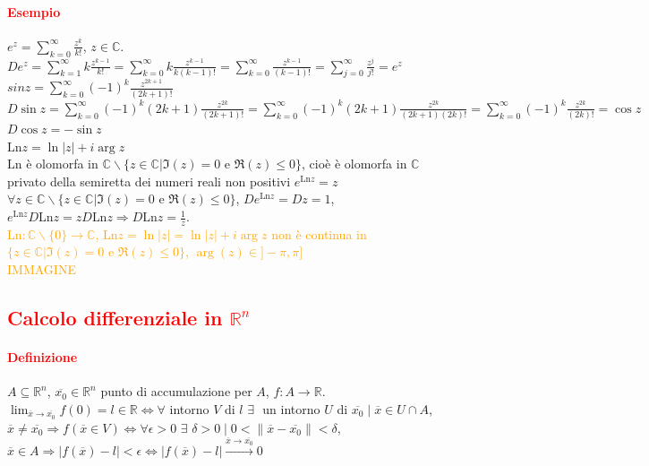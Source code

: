 \documentclass{article}
\newcommand{\R}{\mathbb{R}}
\newcommand{\C}{\mathbb{C}}
\newcommand{\Ln}{\text{Ln}}
\begin{document}
\paragraph{\textcolor{red}{Esempio}}
$e^z=\sum_{k=0}^{\infty}\frac{z^k}{k!}$, $z \in \C$.\\
$De^z=\sum_{k=1}^{\infty}k\frac{z^{k-1}}{k!}=\sum_{k=0}^{\infty} k \frac{z^{k-1}}{k(k-1)!}=\sum_{k=0}^{\infty} \frac{z^{k-1}}{(k-1)!}=\sum_{j=0}^{\infty} \frac{z^{j}}{j!}=e^z$\\
$sin z= \sum_{k=0}^{\infty}(-1)^k\frac{z^{2k+1}}{(2k+1)!}$\\
$D\sin z=\sum_{k=0}^{\infty}(-1)^k(2k+1)\frac{z^{2k}}{(2k+1)!}=\sum_{k=0}^{\infty}(-1)^k(2k+1)\frac{z^{2k}}{(2k+1)(2k)!}=\sum_{k=0}^{\infty}(-1)^k\frac{z^{2k}}{(2k)!}=\cos z$\\
$D\cos z=-\sin z$\\
$\Ln z = \ln |z|+i \arg z$\\
$\Ln $ è olomorfa in $\C\backslash\{z \in \C|\Im(z)=0 \text{  e  } \Re(z) \leq 0 \}$, cioè è olomorfa in $\C$ privato della semiretta dei numeri reali non positivi $e^{\Ln z}=z$ $\forall z \in \C\backslash\{z \in \C|\Im(z)=0 \text{  e  } \Re(z) \leq 0 \}$, $D e^{\Ln z}=Dz =1$, $e^{\Ln z}D\Ln z=zD\Ln z \Rightarrow D \Ln z =\frac{1}{z}$.\\
\textcolor{orange}{$\Ln: \C\backslash\{0\}\rightarrow\C$, $\Ln z=\ln |z|=\ln |z|+i \arg z$ non è continua in $\{z \in \C|\Im(z)=0 \text{  e  } \Re(z)\leq 0\}$, $\arg(z)\in]-\pi,\pi]$\\
IMMAGINE}

\subsection{\textcolor{red}{Calcolo differenziale in $\R^n$}}
\paragraph{\textcolor{red}{Definizione}}
$A \subseteq \R^n$, $\overline{x_0}\in \R^n$ punto di accumulazione per $A$, $f:A\rightarrow \R$. $ \lim_{\overline{x}\rightarrow\overline{x_0} }f(0)=l \in \R\Leftrightarrow \forall$ intorno $V$ di $l\,\, \exists\,\,$ un intorno $U$ di $\overline{x_0}\mid \overline{x}\in U \cap A$, $\overline{x}\neq \overline{x_0}\Rightarrow f(\overline{x}\in V) \Leftrightarrow \forall \epsilon >0\,\, \exists\,\, \delta >0\mid 0 < \|\overline{x}-\overline{x_0} \| <\delta$, $\overline{x}\in A\Rightarrow |f(\overline{x})-l|< \epsilon \Leftrightarrow |f(\overline{x})-l|\xrightarrow{\overline{x}\rightarrow\overline{x_0}}0$
\end{document}
